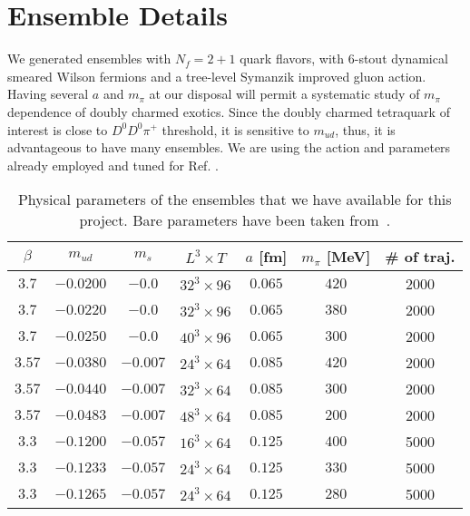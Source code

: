 \section{Ensemble Details}
We generated ensembles with $N_f = 2+1$ quark flavors, with 6-stout dynamical smeared Wilson fermions and a tree-level Symanzik improved gluon action. Having several $a$ and $m_{\pi}$ at our disposal will permit a systematic study of $m_{\pi}$ dependence of doubly charmed exotics. Since the doubly charmed tetraquark of interest is close to $D^0D^0\pi^+$ threshold, it is sensitive to $m_{ud}$, thus, it is advantageous to have many ensembles. 
We are using the action and parameters already employed and tuned for Ref. \cite{Durr:2008zz}. 

\begin{table}[!h]
  \centering \footnotesize
  \begin{tabular}{|c|c|c|c|c|c|c|}
  \hline
  $\beta$  & $m_{ud}$   & $m_{s}$   & $L^3 \times T$  & $a$ [fm]   & $m_\pi$ [MeV]   & \# of traj. \\ \hline \hline
  $3.7$    & $-0.0200$  & $-0.0$    & $32^3\times96$  & $0.065$      & $420$         &  2000      \\ 
  $3.7$    & $-0.0220$  & $-0.0$    & $32^3\times96$  & $0.065$      & $380$         &  2000      \\ 
  $3.7$    & $-0.0250$  & $-0.0$    & $40^3\times96$  & $0.065$      & $300$         &  2000      \\ \hline
  $3.57$   & $-0.0380$  & $-0.007$  & $24^3\times64$  & $0.085$      & $420$         &  2000      \\ 
  $3.57$   & $-0.0440$  & $-0.007$  & $32^3\times64$  & $0.085$      & $300$         &  2000      \\ 
  $3.57$   & $-0.0483$  & $-0.007$  & $48^3\times64$  & $0.085$      & $200$         &  2000      \\ \hline
  $3.3$    & $-0.1200$  & $-0.057$  & $16^3\times64$  & $0.125$      & $400$         &  5000      \\ 
  $3.3$    & $-0.1233$  & $-0.057$  & $24^3\times64$  & $0.125$      & $330$         &  5000      \\ 
  $3.3$    & $-0.1265$  & $-0.057$  & $24^3\times64$  & $0.125$      & $280$         &  5000      \\ \hline
  \end{tabular}
  \caption{Physical parameters of the ensembles that we have available for this project. Bare parameters have been taken from~\cite{Durr:2008zz}.}
  \end{table}


